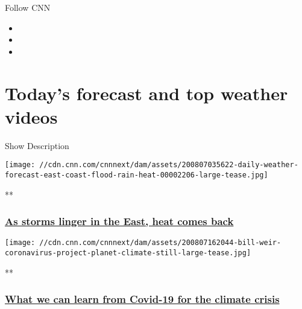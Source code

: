 Follow CNN

\begin{itemize}
\item
\item
\item
\end{itemize}

\hypertarget{todays-forecast-and-top-weather-videos}{%
\section{Today's forecast and top weather
videos}\label{todays-forecast-and-top-weather-videos}}

Show Description

\href{/videos/weather/2020/08/07/daily-weather-forecast-east-coast-flood-rain-heat.cnn}{}

\texttt{[image: //cdn.cnn.com/cnnnext/dam/assets/200807035622-daily-weather-forecast-east-coast-flood-rain-heat-00002206-large-tease.jpg]}

**

\hypertarget{as-storms-linger-in-the-east-heat-comes-back}{%
\subsubsection{\texorpdfstring{\href{/videos/weather/2020/08/07/daily-weather-forecast-east-coast-flood-rain-heat.cnn}{As
storms linger in the East, heat comes
back}}{As storms linger in the East, heat comes back}}\label{as-storms-linger-in-the-east-heat-comes-back}}

\href{/videos/weather/2020/08/07/bill-weir-climate-covid-19-project-planet-orig.cnn}{}

\texttt{[image: //cdn.cnn.com/cnnnext/dam/assets/200807162044-bill-weir-coronavirus-project-planet-climate-still-large-tease.jpg]}

**

\hypertarget{what-we-can-learn-from-covid-19-for-the-climate-crisis}{%
\subsubsection{\texorpdfstring{\href{/videos/weather/2020/08/07/bill-weir-climate-covid-19-project-planet-orig.cnn}{What
we can learn from Covid-19 for the climate
crisis}}{What we can learn from Covid-19 for the climate crisis}}\label{what-we-can-learn-from-covid-19-for-the-climate-crisis}}

\href{/videos/us/2020/08/07/new-york-city-power-outages-es-ldn-vpx.cnn}{}


